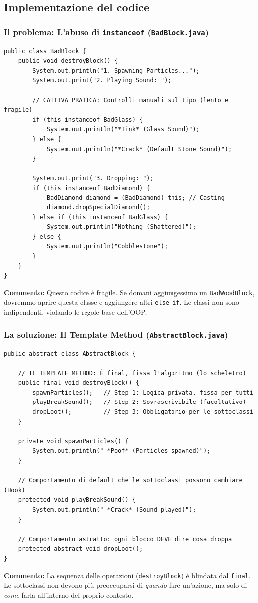 \documentclass[12pt, a4paper]{article}
\begin{document}
\newpage

\subsection{Implementazione del codice}

\subsubsection{Il problema: L'abuso di \texttt{instanceof} (\texttt{BadBlock.java})}
\begin{verbatim}
public class BadBlock {
    public void destroyBlock() {
        System.out.println("1. Spawning Particles...");
        System.out.print("2. Playing Sound: ");
        
        // CATTIVA PRATICA: Controlli manuali sul tipo (lento e fragile)
        if (this instanceof BadGlass) {
            System.out.println("*Tink* (Glass Sound)");
        } else {
            System.out.println("*Crack* (Default Stone Sound)");
        }

        System.out.print("3. Dropping: ");
        if (this instanceof BadDiamond) {
            BadDiamond diamond = (BadDiamond) this; // Casting
            diamond.dropSpecialDiamond();
        } else if (this instanceof BadGlass) {
            System.out.println("Nothing (Shattered)");
        } else {
            System.out.println("Cobblestone");
        }
    }
}
\end{verbatim}
\textbf{Commento:} Questo codice è fragile. Se domani aggiungessimo un \texttt{BadWoodBlock}, dovremmo aprire questa classe e aggiungere altri \texttt{else if}. Le classi non sono indipendenti, violando le regole base dell'OOP.

\newpage

\subsubsection{La soluzione: Il Template Method (\texttt{AbstractBlock.java})}
\begin{verbatim}
public abstract class AbstractBlock {

    // IL TEMPLATE METHOD: È final, fissa l'algoritmo (lo scheletro)
    public final void destroyBlock() {
        spawnParticles();   // Step 1: Logica privata, fissa per tutti
        playBreakSound();   // Step 2: Sovrascrivibile (facoltativo)
        dropLoot();         // Step 3: Obbligatorio per le sottoclassi
    }

    private void spawnParticles() {
        System.out.println(" *Poof* (Particles spawned)");
    }

    // Comportamento di default che le sottoclassi possono cambiare (Hook)
    protected void playBreakSound() {
        System.out.println(" *Crack* (Sound played)");
    }

    // Comportamento astratto: ogni blocco DEVE dire cosa droppa
    protected abstract void dropLoot();
}
\end{verbatim}
\textbf{Commento:} La sequenza delle operazioni (\texttt{destroyBlock}) è blindata dal \texttt{final}. Le sottoclassi non devono più preoccuparsi di \textit{quando} fare un'azione, ma solo di \textit{come} farla all'interno del proprio contesto.
\end{document}
